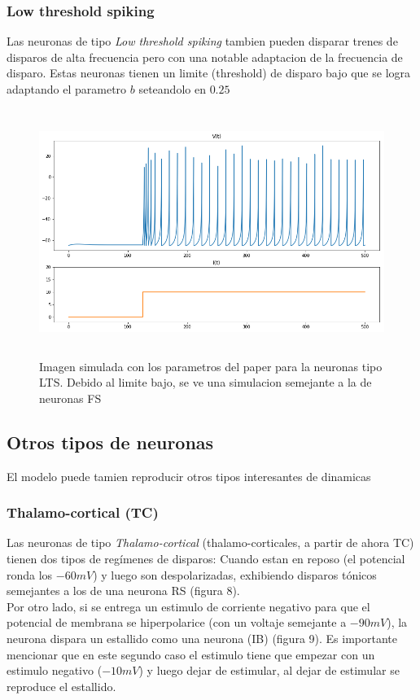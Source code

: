 \documentclass[12pt]{article}
\begin{document}
\subsubsection{Low threshold spiking}
Las neuronas de tipo \textit{Low threshold spiking} tambien pueden disparar trenes de disparos de alta frecuencia pero con una notable adaptacion de la frecuencia de disparo. Estas neuronas tienen un limite (threshold)
de disparo bajo que se logra adaptando el parametro $b$ seteandolo en $0.25$

\begin{figure}[h!]
    \centering
        \includegraphics[height=8cm]{images/LTS.png}
    \caption[fontsize=2pt]{Imagen simulada con los parametros del paper para la neuronas tipo LTS. Debido al limite bajo, se ve una simulacion semejante a la de neuronas FS}
\end{figure}
\newpage

\subsection{Otros tipos de neuronas}
El modelo puede tamien reproducir otros tipos interesantes de dinamicas

\subsubsection{Thalamo-cortical (TC)}
Las neuronas de tipo \textit{Thalamo-cortical} (thalamo-corticales, a partir de ahora TC) tienen dos tipos de regímenes de disparos:
Cuando estan en reposo (el potencial ronda los $-60 mV$) y luego son despolarizadas, exhibiendo disparos tónicos semejantes a los de una neurona RS (figura 8). \\
Por otro lado, si se entrega un estimulo de corriente negativo para que el potencial de membrana se hiperpolarice (con un voltaje semejante a $-90 mV$), la neurona dispara un estallido como una neurona (IB) (figura 9).
Es importante mencionar que en este segundo caso el estimulo tiene que empezar con un estimulo negativo ($-10mV$) y luego dejar de estimular, al dejar de estimular se reproduce el estallido.
\end{document}
